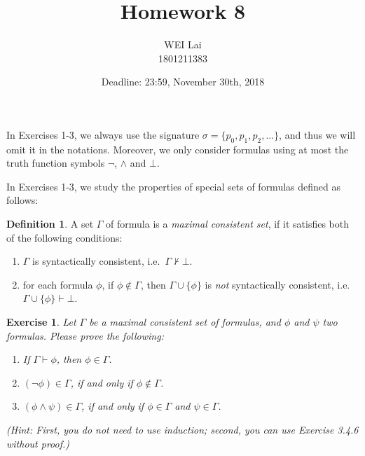 \documentclass[12pt,a4paper]{article}
\title{Homework 8}
\author{WEI Lai\\
1801211383}
\date{Deadline: 23:59, November 30th, 2018}
\theoremstyle{plain}
\newtheorem{exercise}{Exercise}
\theoremstyle{definition}
\newtheorem{definition}{Definition}
\begin{document}
\maketitle



In Exercises 1-3, we always use the signature $\sigma = \{ p_0 , p_1 , p_2 , \dots \}$, and thus we will omit it in the notations.
Moreover, we only consider formulas using at most the truth function symbols $\neg$, $\wedge$ and $\bot$.

In Exercises 1-3, we study the properties of special sets of formulas defined as follows:

\begin{definition}
A set $\Gamma$ of formula is a \emph{maximal consistent set}, if it satisfies both of the following conditions: 
%
\begin{enumerate}

\item $\Gamma$ is syntactically consistent, i.e.\ $\Gamma \not \vdash \bot$.

\item for each formula $\phi$, if $\phi \not \in \Gamma$, then $\Gamma \cup \{ \phi \}$ is \emph{not} syntactically consistent, i.e.\ $\Gamma \cup \{ \phi \} \vdash \bot$.
\ \\ 

\end{enumerate}
\end{definition}


\begin{exercise}
Let $\Gamma$ be a maximal consistent set of formulas, and $\phi$ and $\psi$ two formulas.
Please prove the following:
%
\begin{enumerate}

\item If $\Gamma \vdash \phi$, then $\phi \in \Gamma$.

\item $( \neg \phi ) \in \Gamma$, if and only if $\phi \not \in \Gamma$.

\item $( \phi \wedge \psi ) \in \Gamma$, if and only if $\phi \in \Gamma$ and $\psi \in \Gamma$.

\end{enumerate}  
%
(Hint: First, you do not need to use induction; second, you can use Exercise 3.4.6 without proof.)
\end{exercise}
\end{document}
